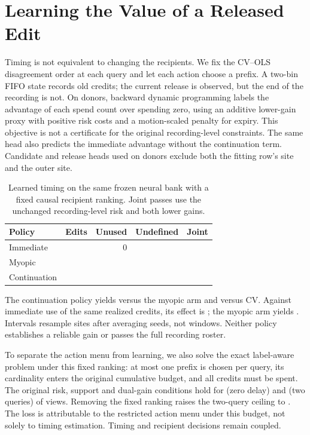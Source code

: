 \section{Learning the Value of a Released Edit}

Timing is not equivalent to changing the recipients.
We fix the CV--OLS disagreement order at each query and let
each action choose a prefix. A two-bin FIFO state records old
credits; the current release is observed, but the end of the
recording is not. On donors, backward dynamic programming
labels the advantage of each spend count over spending zero,
using an additive lower-gain proxy with positive risk costs and
a motion-scaled penalty for expiry. This objective is not a
certificate for the original recording-level constraints.
The same head also predicts the immediate advantage without
the continuation term. Candidate and release heads used on
donors exclude both the fitting row's site and the outer site.

\begin{table}[h]
\centering
\caption{Learned timing on the same frozen neural bank with
a fixed causal recipient ranking. Joint passes use the
unchanged recording-level risk and both lower gains.}
\small
\begin{tabular}{lrrrr}
\toprule
Policy & Edits & Unused & Undefined & Joint \\
\midrule
Immediate & \QueueValueNowEdits{} & 0 & \QueueValueNowUndefined{} & \QueueValueNowJoint{} \\
Myopic & \QueueValueOneEdits{} & \QueueValueOneUnused{} & \QueueValueOneUndefined{} & \QueueValueOneJoint{} \\
Continuation & \QueueValueTailEdits{} & \QueueValueTailUnused{} & \QueueValueTailUndefined{} & \QueueValueTailJoint{} \\
\bottomrule
\end{tabular}
\end{table}

The continuation policy yields \QueueValueDifference{} versus
the myopic arm and \QueueValueVersusCV{} versus CV.
Against immediate use of the same realized credits, its effect
is \QueueValueContinue{}; the myopic arm yields \QueueValueMyopic{}.
Intervals resample sites after averaging seeds, not windows.
Neither policy establishes a reliable gain or passes the
full recording roster.

To separate the action menu from learning, we also solve
the exact label-aware problem under this fixed ranking:
at most one prefix is chosen per query, its cardinality
enters the original cumulative budget, and all credits
must be spent. The original risk, support and dual-gain
conditions hold for \QueueValueFixed{} (zero delay) and
\QueueValueDelay{} (two queries) of \QueueValueViews{} views.
Removing the fixed ranking raises the two-query ceiling to
\NeuralCreditShort{}. The loss is attributable to the restricted
action menu under this budget, not solely to timing estimation.
Timing and recipient decisions remain coupled.
